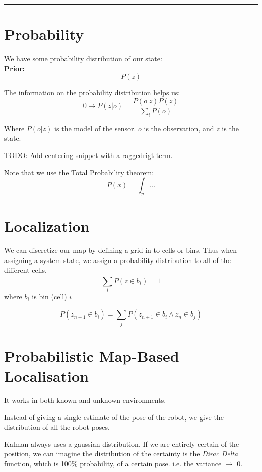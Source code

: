 \documentclass[a4paper]{article}
\begin{document}
\vspace{5pt}
\hrule
\vspace{5pt}

\section{Probability}

We have some probability distribution of our state:\\
\underline{ \textbf{Prior:}}
\[
P(z)
\] 

The information on the probability distribution helps us:
\[
0 \rightarrow P(z | o) =  \frac{P(o|z) P(z)}{\sum_{i}^{}{P(o)} } 
\] 

Where $ P(o|z) $ is the model of the sensor. $ o $ is the observation, and  $ z $ is the state.

TODO: Add centering snippet with a raggedrigt term.
\centering
{}

\raggedright

Note that we use the Total Probability theorem:
\[
	P(x) = \int_{y}...
\] 

\section{Localization}
We can discretize our map by defining a grid in to cells or bins. Thus when assigning a system state, we assign a probability distribution to all of the different cells. 
\[
\sum_{i}^{}{P(z \in b_i) = 1} 
\] 
where $ b_i $ is bin (cell)  $ i $

\begin{equation}
	P(z_{n+1} \in b_i) = \sum_{j}^{}{P(z_{n+1} \in b_i \wedge z_n \in b_j)}
\end{equation}

\hfill {}



\section{Probabilistic Map-Based Localisation}
It works in both known and unknown environments.

Instead of giving a single estimate of the pose of the robot, we give the distribution of all the robot poses.

Kalman always uses a gaussian distribution. 
If we are entirely certain of the position, we can imagine the distribution of the certainty is the \textit{Dirac Delta} function, which is 100\% probability, of a certain pose. i.e. the variance $ \rightarrow  $ 0.
\end{document}
